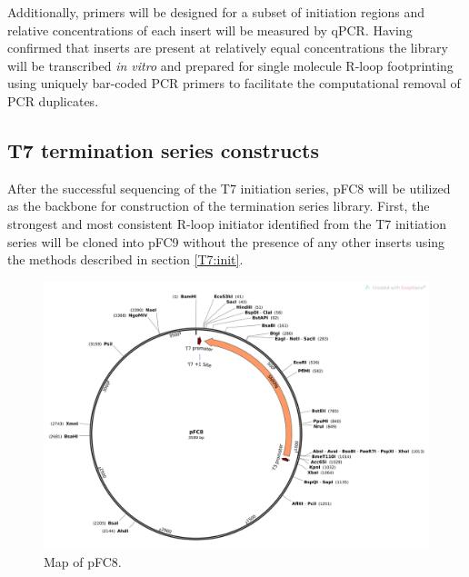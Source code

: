 \documentclass[11pt]{article}
\begin{document}
Additionally, primers will be designed for a subset of initiation regions and relative concentrations of each insert will be measured by qPCR. Having confirmed that inserts are present at relatively equal concentrations the library will be transcribed \emph{in vitro} and prepared for single molecule R-loop footprinting using uniquely bar-coded PCR primers to facilitate the computational removal of PCR duplicates. 


\subsection{T7 termination series constructs}

After the successful sequencing of the T7 initiation series, pFC8 will be utilized as the backbone for construction of the termination series library. First, the strongest and most consistent R-loop initiator identified from the T7 initiation series will be cloned into pFC9 without the presence of any other inserts using the methods described in section \ref{T7:init}. 

\begin{figure}[H]
	\includegraphics[width=12cm]{images/pFC8_Map.png}
	\centering
	\caption{Map of pFC8.}
	\label{fig:pFC8}
\end{figure}
\end{document}
